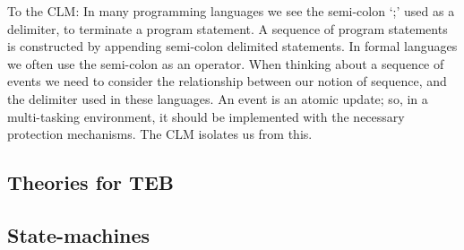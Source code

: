 To the CLM:
In many programming languages we see the semi-colon `;' used as a delimiter, to terminate a program statement. A sequence of program statements is constructed by appending semi-colon delimited statements. In formal languages we often use the semi-colon as an operator. When thinking about a sequence of events we need to consider the relationship between our notion of sequence, and the delimiter used in these languages. An event is an atomic update; so, in a multi-tasking environment, it should be implemented with the necessary protection mechanisms. The CLM isolates us from this.   



\subsection{Theories for TEB}

\subsection{State-machines}